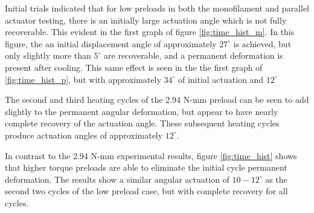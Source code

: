 \documentclass[twocolumn,10pt]{asme2e}
\begin{document}
Initial trials indicated that for low preloads in both the monofilament and parallel actuator testing, there is an initially large actuation angle which is not fully recoverable. This evident in the first graph of figure \ref{fig:time_hist_m}. In this figure, the an initial displacement angle of approximately $27^\circ$ is achieved, but only slightly more than $5^\circ$ are recoverable, and a permanent deformation is present after cooling. This same effect is seen in the the first graph of \ref{fig:time_hist_p}, but with approximately $34^\circ$ of initial actuation and $12^\circ$

 The second and third heating cycles of the 2.94 N-mm preload can be seen to add slightly to the permanent angular deformation, but appear to have nearly complete recovery of the actuation angle. These subsequent heating cycles produce actuation angles of approximately $12^\circ$.

In contrast to the 2.94 N-mm experimental results, figure \ref{fig:time_hist} shows that higher torque preloads are able to eliminate the initial cycle permanent deformation. The results show a similar angular actuation of $10-12^\circ$ as the second two cycles of the low preload case, but with complete recovery for all cycles. 
\end{document}

